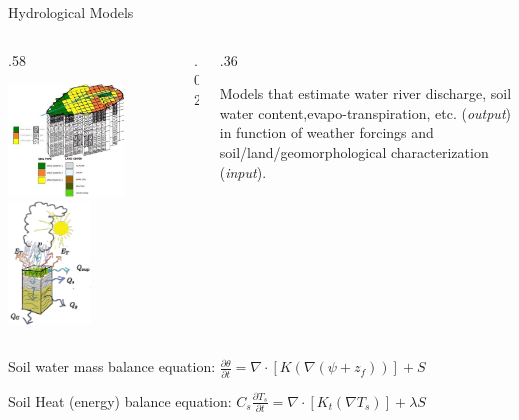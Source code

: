 \documentclass[
  ignorenonframetext,
]{beamer}
\def\begincols{\begin{columns}}
\def\begincol{\begin{column}}
\def\endcol{\end{column}}
\def\endcols{\end{columns}}
\begin{document}
\begin{frame}{Hydrological Models}
\protect\hypertarget{hydrological-models}{}
\begincols
  \begincol{.58\textwidth}

\includegraphics[width=0.7\textwidth,height=\textheight]{resources/images/geotop_grid_mod2.jpg}~
\includegraphics[width=0.5\textwidth,height=\textheight]{resources/images/water_balance.png}\\
\endcol \begincol{.02\textwidth} \endcol \begincol{.36\textwidth}

Models that estimate water river discharge, soil water
content,evapo-transpiration, etc. (\emph{output}) in function of weather
forcings and soil/land/geomorphological characterization (\emph{input}).

\endcol
\endcols

Soil water mass balance equation:
\(\frac{\partial \theta}{\partial t} = \nabla \cdot \left[ K \left(\nabla (\psi+z_f) \right) \right] +S\)

Soil Heat (energy) balance equation:
\(C_s \frac{\partial T_s}{\partial t} = \nabla \cdot \left[ K_t ( \nabla T_s ) \right] +\lambda S\)
\end{frame}
\end{document}
